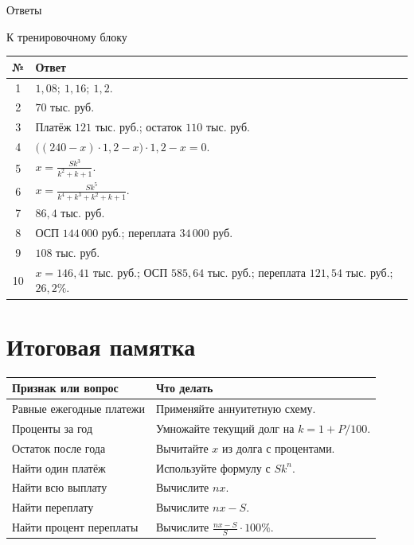 \documentclass[a4paper,12pt]{article}
\begin{document}
\clearpage
\thispagestyle{plain}
\begin{center}
{\Large\color{darkaccent} Ответы}\par
\vspace{3pt}
{\small К тренировочному блоку}
\end{center}
\vspace{6mm}
\renewcommand{\arraystretch}{1.55}
\begin{tabularx}{\linewidth}{@{}cX@{}}
\toprule
№ & Ответ \\
\midrule
1 & \(1{,}08;\ 1{,}16;\ 1{,}2\). \\
2 & \(70\) тыс. руб. \\
3 & Платёж \(121\) тыс. руб.; остаток \(110\) тыс. руб. \\
4 & \(\bigl((240-x)\cdot1{,}2-x\bigr)\cdot1{,}2-x=0\). \\
5 & \(\displaystyle x=\frac{Sk^3}{k^2+k+1}\). \\[7pt]
6 & \(\displaystyle x=\frac{Sk^5}{k^4+k^3+k^2+k+1}\). \\[7pt]
7 & \(86{,}4\) тыс. руб. \\
8 & ОСП \(144\,000\) руб.; переплата \(34\,000\) руб. \\
9 & \(108\) тыс. руб. \\
10 & \(x=146{,}41\) тыс. руб.; ОСП \(585{,}64\) тыс. руб.; переплата \(121{,}54\) тыс. руб.; \(26{,}2\%\). \\
\bottomrule
\end{tabularx}

\vspace{12mm}
\section*{Итоговая памятка}
\begin{tabularx}{\linewidth}{@{}p{54mm}X@{}}
\toprule
Признак или вопрос & Что делать \\
\midrule
Равные ежегодные платежи & Применяйте аннуитетную схему. \\
Проценты за год & Умножайте текущий долг на \(k=1+P/100\). \\
Остаток после года & Вычитайте \(x\) из долга с процентами. \\
Найти один платёж & Используйте формулу с \(Sk^n\). \\
Найти всю выплату & Вычислите \(nx\). \\
Найти переплату & Вычислите \(nx-S\). \\
Найти процент переплаты & Вычислите \(\frac{nx-S}{S}\cdot100\%\). \\
\bottomrule
\end{tabularx}
\end{document}
